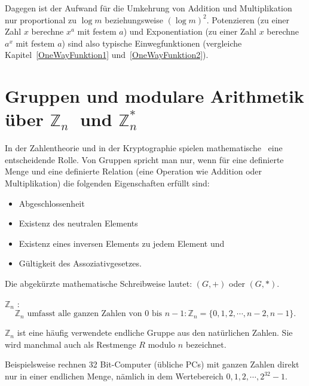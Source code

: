 \begin{refsegment}
\begin{itemize}
\end{itemize}
Dagegen ist der Aufwand für die Umkehrung von Addition und Multiplikation
nur proportional zu $\log m$ beziehungsweise $(\log m)^2$.
Potenzieren (zu einer Zahl $x$ berechne $x^a$ mit festem $a$) und Exponentiation
(zu einer Zahl $x$ berechne $a^x$ mit festem $a$) sind also typische
Einwegfunktionen
(vergleiche Kapitel~\ref{OneWayFunktion1} und~\ref{OneWayFunktion2}).


\section{Gruppen und modulare Arithmetik über \texorpdfstring{$ \mathbb{Z}_n\; $ und $ \mathbb{Z}^*_n $}{Zn und Zn*}}
In der Zahlentheorie und in der Kryptographie spielen mathematische
\grqq~eine entscheidende Rolle. Von Gruppen spricht man nur, wenn für
eine definierte Menge und eine definierte Relation (eine Operation wie
Addition oder Multiplikation) die folgenden Eigenschaften erfüllt sind:
\begin{itemize}
\item Abgeschlossenheit 
\item Existenz des neutralen Elements
\item Existenz eines inversen Elements zu jedem Element und
\item Gültigkeit des Assoziativgesetzes.
\end{itemize}
Die abgekürzte mathematische Schreibweise lautet: $(G, +)$ oder $(G,*)$.
\begin{definition}\label{def-zth-zn}
$\mathbb{Z}_n$ :
$$\mathbb{Z}_n \text{ umfasst alle ganzen Zahlen von } 0 \text{ bis } n-1: \mathbb{Z}_n = \{0, 1, 2,\cdots, n-2, n-1\}.$$
\end{definition}
$\mathbb{Z}_n$ ist eine häufig verwendete endliche Gruppe aus den natürlichen Zahlen. Sie
wird manchmal auch als Restmenge $R$ modulo $n$  bezeichnet.

Beispielsweise rechnen 32 Bit-Computer (übliche PCs) mit ganzen Zahlen
direkt nur in einer endlichen Menge, nämlich in dem Wertebereich $0, 1, 2,
\cdots, 2^{32}-1$.


\end{refsegment}
